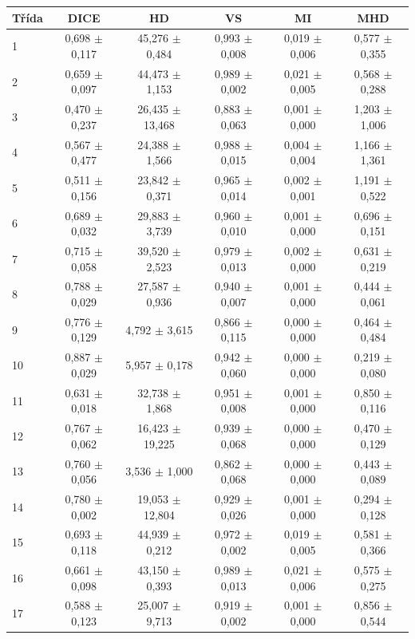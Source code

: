 \begin{tabular}{l c c c c c}
 \hline
Třída & DICE & HD & VS & MI & MHD \\ \hline
1 & 0,698 $\pm$ 0,117 & 45,276 $\pm$ 0,484 & 0,993 $\pm$ 0,008 & 0,019 $\pm$ 0,006 & 0,577 $\pm$ 0,355 \\
2 & 0,659 $\pm$ 0,097 & 44,473 $\pm$ 1,153 & 0,989 $\pm$ 0,002 & 0,021 $\pm$ 0,005 & 0,568 $\pm$ 0,288 \\
3 & 0,470 $\pm$ 0,237 & 26,435 $\pm$ 13,468 & 0,883 $\pm$ 0,063 & 0,001 $\pm$ 0,000 & 1,203 $\pm$ 1,006 \\
4 & 0,567 $\pm$ 0,477 & 24,388 $\pm$ 1,566 & 0,988 $\pm$ 0,015 & 0,004 $\pm$ 0,004 & 1,166 $\pm$ 1,361 \\
5 & 0,511 $\pm$ 0,156 & 23,842 $\pm$ 0,371 & 0,965 $\pm$ 0,014 & 0,002 $\pm$ 0,001 & 1,191 $\pm$ 0,522 \\
6 & 0,689 $\pm$ 0,032 & 29,883 $\pm$ 3,739 & 0,960 $\pm$ 0,010 & 0,001 $\pm$ 0,000 & 0,696 $\pm$ 0,151 \\
7 & 0,715 $\pm$ 0,058 & 39,520 $\pm$ 2,523 & 0,979 $\pm$ 0,013 & 0,002 $\pm$ 0,000 & 0,631 $\pm$ 0,219 \\
8 & 0,788 $\pm$ 0,029 & 27,587 $\pm$ 0,936 & 0,940 $\pm$ 0,007 & 0,001 $\pm$ 0,000 & 0,444 $\pm$ 0,061 \\
9 & 0,776 $\pm$ 0,129 & 4,792 $\pm$ 3,615 & 0,866 $\pm$ 0,115 & 0,000 $\pm$ 0,000 & 0,464 $\pm$ 0,484 \\
10 & 0,887 $\pm$ 0,029 & 5,957 $\pm$ 0,178 & 0,942 $\pm$ 0,060 & 0,000 $\pm$ 0,000 & 0,219 $\pm$ 0,080 \\
11 & 0,631 $\pm$ 0,018 & 32,738 $\pm$ 1,868 & 0,951 $\pm$ 0,008 & 0,001 $\pm$ 0,000 & 0,850 $\pm$ 0,116 \\
12 & 0,767 $\pm$ 0,062 & 16,423 $\pm$ 19,225 & 0,939 $\pm$ 0,068 & 0,000 $\pm$ 0,000 & 0,470 $\pm$ 0,129 \\
13 & 0,760 $\pm$ 0,056 & 3,536 $\pm$ 1,000 & 0,862 $\pm$ 0,068 & 0,000 $\pm$ 0,000 & 0,443 $\pm$ 0,089 \\
14 & 0,780 $\pm$ 0,002 & 19,053 $\pm$ 12,804 & 0,929 $\pm$ 0,026 & 0,001 $\pm$ 0,000 & 0,294 $\pm$ 0,128 \\
15 & 0,693 $\pm$ 0,118 & 44,939 $\pm$ 0,212 & 0,972 $\pm$ 0,002 & 0,019 $\pm$ 0,005 & 0,581 $\pm$ 0,366 \\
16 & 0,661 $\pm$ 0,098 & 43,150 $\pm$ 0,393 & 0,989 $\pm$ 0,013 & 0,021 $\pm$ 0,006 & 0,575 $\pm$ 0,275 \\
17 & 0,588 $\pm$ 0,123 & 25,007 $\pm$ 9,713 & 0,919 $\pm$ 0,002 & 0,001 $\pm$ 0,000 & 0,856 $\pm$ 0,544 \\

\end{tabular}
